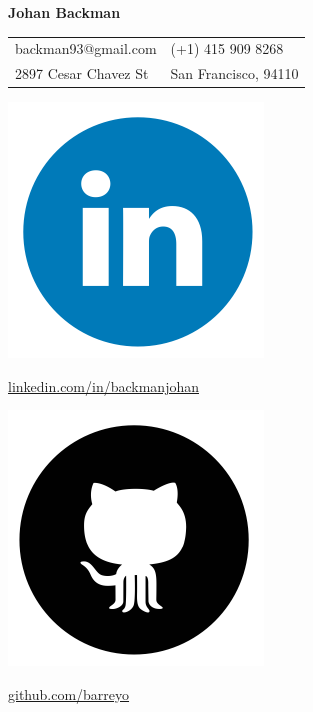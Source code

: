\documentclass{cv_doc}
\begin{document}
\textbf{{\sffamily\huge Johan Backman}} \\

\begin{tabular}{@{}l l }
 backman93@gmail.com & (+1) 415 909 8268 \\
 2897 Cesar Chavez St & San Francisco, 94110 \\
\end{tabular}

\vspace{0.12cm}

\begin{minipage}[c]{0.03\textwidth}
\includegraphics[scale=0.04]{linkedin}
\end{minipage}
\begin{minipage}[c]{0.25\textwidth}
{\small \href{https://linkedin.com/in/backmanjohan}{linkedin.com/in/backmanjohan}}
\end{minipage}

\begin{minipage}[c]{0.03\textwidth}
\includegraphics[scale=0.04]{github}
\end{minipage}
\begin{minipage}[c]{0.25\textwidth}
{\small \href{https://github.com/barreyo}{github.com/barreyo}}
\end{minipage}
\end{document}
